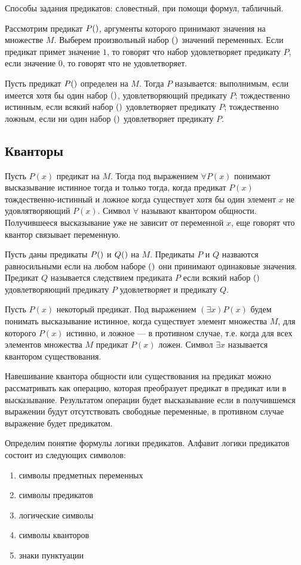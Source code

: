 \documentclass[letterpaper, 10pt]{article}
\theoremstyle{definition}
\begin{document}
	Способы задания предикатов: словестный, при помощи формул, табличный.

	Рассмотрим предикат $P(\rseq x)$, аргументы которого принимают
	значения на множестве $M$. Выберем произвольный набор $(\rseq a)$
	значений переменных. Если предикат примет значение $1$, то говорят что набор
	удовлетворяет предикату $P$, если значение $0$, то говорят что не
	удовлетворяет.

	Пусть предикат $P(\rseq x)$ определен на $M$. Тогда $P$ называется:
	выполнимым, если имеется хотя бы один набор $(\rseq a)$, удовлетворяющий
	предикату $P$;
	тождественно истинным, если всякий набор $(\rseq a)$ удовлетворяет предикату
	$P$;
	тождественно ложным, если ни один набор  $(\rseq a)$ удовлетворяет предикату
	$P$.

	\subsection{Кванторы}
	Пусть $P(x)$ предикат на $M$. Тогда под выражением $\forall P(x)$ понимают
	высказывание истинное тогда и только тогда, когда предикат $P(x)$
	тождественно-истинный и ложное когда существует хотя бы один элемент $x$ не
	удовлятворяющий $P(x)$.
	Символ $\forall$ называют квантором общности. Получившееся высказывание уже
	не зависит от переменной $x$, еще говорят что квантор связывает переменную.

	Пусть даны предикаты $P(\rseq x)$ и $Q(\rseq x)$ на $M$. Предикаты $P$ и $Q$
	назваются равносильными если на любом наборе $(\rseq a)$ они принимают
	одинаковые значения. Предикат $Q$ называется следствием предиката $P$ если
	всякий набор $(\rseq a)$ удовлетворяющий предикату $P$ удовлетворяет и
	предикату $Q$.

	Пусть $P(x)$ некоторый предикат. Под выражением $(\exists x )P(x)$ будем
	понимать высказывание истинное, когда существует элемент множества $M$, для
	которого $P(x)$ истинно, и ложное --- в противном случае, т.е. когда для
	всех элементов множества $M$ предикат $P(x)$ ложен. Символ $\exists x$
	называется квантором существования.

	Навешивание квантора общности или существования на предикат можно
	рассматривать как операцию, которая преобразует предикат в предикат или в
	высказывание. Результатом операции будет высказывание если в получившемся
	выражении будут отсутствовать свободные переменные, в противном случае
	выражение будет предикатом.

	Определим понятие формулы логики предикатов.
	Алфавит логики предикатов состоит из следующих символов:
	\begin{enumerate}
		\item символы предметных переменных
		\item символы предикатов
		\item логические символы
		\item символы кванторов
		\item знаки пунктуации
	\end{enumerate}
\end{document}
